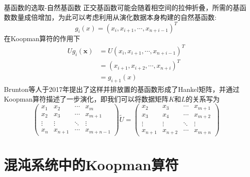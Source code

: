 \documentclass{beamer}
\begin{document}
		\begin{frame}{基函数的选取-自然基函数}
			正交基函数可能会随着相空间的拉伸折叠，所需的基函数数量成倍增加，为此可以考虑利用从演化数据本身构建的自然基函数:
			$$g_i(x)=(x_i,x_{i+1},\cdots,x_{n+i-1})^T$$
			在Koopman算符的作用下
			\begin{equation*}
			\begin{aligned}
			Ug_i(\mathbf{x})&=U(x_i,x_{i+1},\cdots,x_{n+i-1})^T\\
			&=(x_{i+1},x_{i+2},\cdots,x_{n+i})^T\\
			&=g_{i+1}(x)
			\end{aligned}
			\end{equation*}
			Brunton等人于2017年提出了这样并排放置的基函数形成了Hankel矩阵，并通过Koopman算符描述了一步演化，即我们可以将数据矩阵$K$和$L$的关系写为
			\begin{equation*}
			\begin{pmatrix}
			x_1&x_2&\cdots&x_m\\
			x_2&x_3&\cdots&x_{m+1}\\
			\vdots&\vdots&\ddots&\vdots\\
			x_n&x_{n+1}&\cdots&x_{m+n-1}
			\end{pmatrix}
			\tilde{U}=
			\begin{pmatrix}
			x_2&x_3&\cdots&x_{m+1}\\
			x_3&x_4&\cdots&x_{m+2}\\
			\vdots&\vdots&\ddots&\vdots\\
			x_{n+1}&x_{n+2}&\cdots&x_{m+n}
			\end{pmatrix}
			\end{equation*}
		\end{frame}
	
\section{混沌系统中的Koopman算符}
\end{document}
